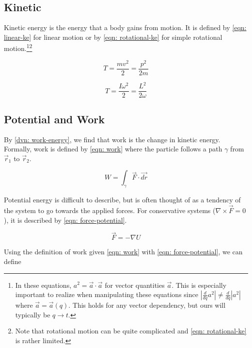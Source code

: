 \documentclass[main.tex]{subfiles}
\begin{document}
\subsection{Kinetic}

Kinetic energy is the energy that a body gains from motion. It is defined by
\cref{eqn: linear-ke} for linear motion or by \cref{eqn: rotational-ke} for simple rotational
motion.\footnote{In these equations, $a^2 = \vec{a} \cdot \vec{a}$ for vector
quantities $\vec{a}$. This is especially important to realize when manipulating these
equations since
$\left| \frac{d}{dq} a^2 \right| \neq \frac{d}{dq} \left| a^2 \right|$ where
$\vec{a} = \vec{a}(q)$. This holds for any vector dependency, but ours will typically be
$q \to t$.}\footnote{Note that rotational motion can be quite complicated and
\cref{eqn: rotational-ke} is rather limited.}

\begin{equation}
\label{eqn: linear-ke}
T = \frac{m v^2}{2} = \frac{p^2}{2m}
\end{equation}

\begin{equation}
\label{eqn: rotational-ke}
T = \frac{I \omega^2}{2} = \frac{L^2}{2 \omega}
\end{equation}


\subsection{Potential and Work}
By \cref{dvn: work-energy}, we find that work is the change in kinetic energy. Formally,
work is defined by \cref{eqn: work} where the particle follows a path $\gamma$ from
$\vec{r}_1$ to $\vec{r}_2$.

\begin{equation} \label{eqn: work}
W = \int_{\gamma} \vec{F} \cdot \vec{dr}
\end{equation}

Potential energy is difficult to describe, but is often thought of as a tendency of the
system to go towards the applied forces. For conservative systems
($\nabla \times \vec{F} = 0$), it is described by \cref{eqn: force-potential}.

\begin{equation}
\label{eqn: force-potential}
\vec{F} = - \nabla U
\end{equation}

Using the definition of work given \cref{eqn: work} with \cref{eqn: force-potential}, we
can define
\end{document}
